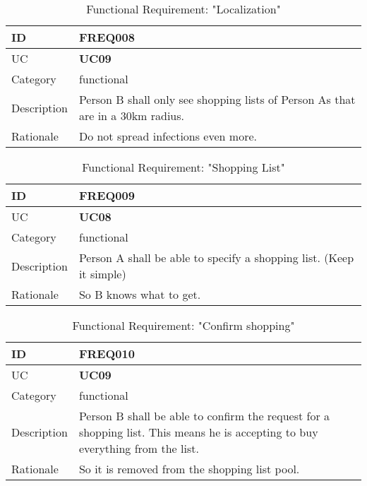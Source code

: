 \vspace{5mm}
\begin{table}[H]
	\begin{tabular}{ |p{2cm}||p{9cm}| }
		\hline
        ID & \textbf{FREQ008}\\ \hline
        UC & \textbf{UC09} \\ \hline
		Category & functional \\ \hline
		Description &
		Person B shall only see shopping lists of Person As that are in a 30km radius. 
		\\ \hline
		Rationale & Do not spread infections even more. \\ \hline
	\end{tabular}
	\caption{Functional Requirement: "Localization"}
\end{table}

\vspace{5mm}
\begin{table}[H]
	\begin{tabular}{ |p{2cm}||p{9cm}| }
		\hline
        ID & \textbf{FREQ009}\\ \hline
        UC & \textbf{UC08} \\ \hline
		Category & functional \\ \hline
		Description &
		Person A shall be able to specify a shopping list. (Keep it simple)
		\\ \hline
		Rationale & So B knows what to get. \\ \hline
	\end{tabular}
	\caption{Functional Requirement: "Shopping List"}
\end{table}

\vspace{5mm}
\begin{table}[H]
	\begin{tabular}{ |p{2cm}||p{9cm}| }
		\hline
        ID & \textbf{FREQ010}\\ \hline
        UC & \textbf{UC09} \\ \hline
		Category & functional \\ \hline
		Description &
        Person B shall be able to confirm the request for a shopping list. 
        This means he is accepting to buy everything from the list.
		\\ \hline
		Rationale & So it is removed from the shopping list pool. \\ \hline
	\end{tabular}
	\caption{Functional Requirement: "Confirm shopping"}
\end{table}

